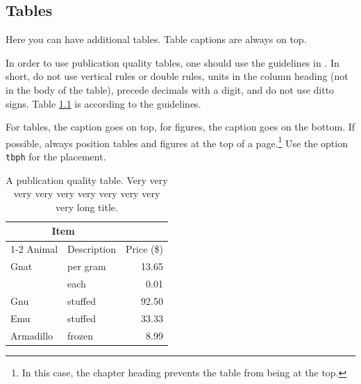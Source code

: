 \documentclass[msc,oneside]{ubcthesis}%
\begin{document}

%

\newpage
\pagestyle{headings}

\begin{appendices}
\addappheadtotoc %
\appendixpage %


\chapter{Tables}
Here you can have additional tables. Table captions are always on top.

In order to use publication quality tables, one should use the guidelines in \cite{Fear:2005manual}. In short, do not use vertical rules or double rules, units in the column heading (not in the body of the table), precede decimals with a digit, and do not use ditto signs. Table \ref{table:food} is according to the guidelines. 

For tables, the caption goes on top, for figures, the caption goes on the bottom. If possible, always position tables and figures at the top of a page.\footnote{In this case, the chapter heading prevents the table from being at the top.} Use the option \verb|tbph| for the placement.

\begin{table}[tbph]
\centering
\caption{A publication quality table. Very very very very very very very very very very long title.
\label{table:food}}
\begin{tabular}{@{}llr@{}} \toprule 
\multicolumn{2}{c}{Item} \\ \cmidrule(r){1-2} 
Animal & Description & Price (\$)\\ \midrule 
Gnat & per gram & 13.65 \\ 
& each & 0.01 \\ 
Gnu & stuffed & 92.50 \\ 
Emu & stuffed & 33.33 \\ 
Armadillo & frozen & 8.99 \\ \bottomrule 
\end{tabular}
\end{table}


\end{appendices}
\end{document}
